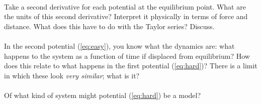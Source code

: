 \documentclass[12pt]{article}
\begin{document}
\paragraph{\theproblem}%
Take a second derivative for each potential at the equilibrium point.
What are the units of this second derivative?  Interpret it physically
in terms of force and distance. What does this have to do with the
Taylor series? Discuss.

\paragraph{\theproblem}%
In the second potential (\ref{eq:easy}), you know what the dynamics
are: what happens to the system as a function of time if displaced
from equilibrium?  How does this relate to what happens in the first
potential (\ref{eq:hard})?  There is a limit in which these look
\emph{very similar}; what is it?

\paragraph{\theproblem}%
Of what kind of system might potential (\ref{eq:hard}) be a model?
\end{document}
